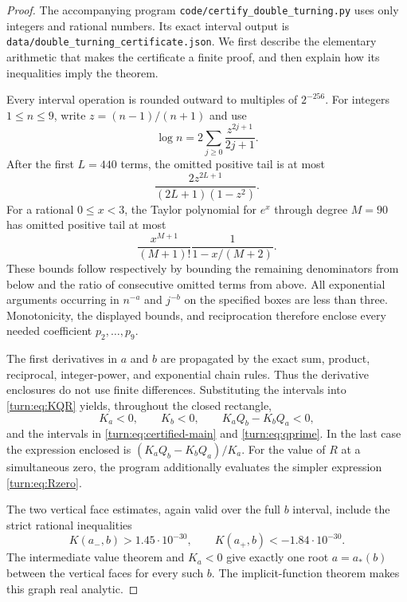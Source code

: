 \begin{proof}
The accompanying program \texttt{code/certify\_double\_turning.py}
uses only integers and rational numbers.  Its exact interval output is
\texttt{data/double\_turning\_certificate.json}.  We first describe
the elementary arithmetic that makes the certificate a finite proof,
and then explain how its inequalities imply the theorem.

Every interval operation is rounded outward to multiples of
$2^{-256}$.  For integers $1\le n\le9$, write $z=(n-1)/(n+1)$ and use
\[
 \log n=2\sum_{j\ge0}\frac{z^{2j+1}}{2j+1}.
\]
After the first $L=440$ terms, the omitted positive tail is at most
\begin{equation}
 \frac{2z^{2L+1}}{(2L+1)(1-z^2)}.
 \label{turn:eq:log-tail}
\end{equation}
For a rational $0\le x<3$, the Taylor polynomial for $e^x$ through
degree $M=90$ has omitted positive tail at most
\begin{equation}
 \frac{x^{M+1}}{(M+1)!}\frac{1}{1-x/(M+2)}.
 \label{turn:eq:exp-tail}
\end{equation}
These bounds follow respectively by bounding the remaining denominators
from below and the ratio of consecutive omitted terms from above.
All exponential arguments occurring in $n^{-a}$ and $j^{-b}$ on the
specified boxes are less than three.  Monotonicity, the displayed
bounds, and reciprocation therefore enclose every needed coefficient
$p_2,\ldots,p_9$.

The first derivatives in $a$ and $b$ are propagated by the exact sum,
product, reciprocal, integer-power, and exponential chain rules.  Thus
the derivative enclosures do not use finite differences.  Substituting
the intervals into \eqref{turn:eq:KQR} yields, throughout the closed
rectangle,
\[
 K_a<0,\qquad K_b<0,\qquad K_aQ_b-K_bQ_a<0,
\]
and the intervals in \eqref{turn:eq:certified-main} and
\eqref{turn:eq:qprime}.  In the last case the expression enclosed is
$(K_aQ_b-K_bQ_a)/K_a$.  For the value of $R$ at a simultaneous zero,
the program additionally evaluates the simpler expression
\eqref{turn:eq:Rzero}.

The two vertical face estimates, again valid over the full $b$ interval,
include the strict rational inequalities
\begin{equation}
 K(a_-,b)>1.45\cdot10^{-30},\qquad
 K(a_+,b)<-1.84\cdot10^{-30}.
 \label{turn:eq:face-signs}
\end{equation}
The intermediate value theorem and $K_a<0$ give exactly one root
$a=a_*(b)$ between the vertical faces for every such $b$.  The
implicit-function theorem makes this graph real analytic.


\end{proof}
